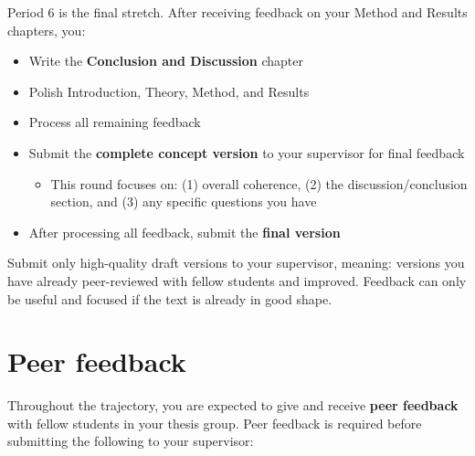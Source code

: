 \documentclass[
  11pt,
  a4paper,
]{scrbook}
\providecommand{\tightlist}{%
  \setlength{\itemsep}{0pt}\setlength{\parskip}{0pt}}\usepackage{longtable,booktabs,array}
\begin{document}
Period 6 is the final stretch. After receiving feedback on your Method
and Results chapters, you:

\begin{itemize}
\tightlist
\item
  Write the \textbf{Conclusion and Discussion} chapter
\item
  Polish Introduction, Theory, Method, and Results
\item
  Process all remaining feedback
\item
  Submit the \textbf{complete concept version} to your supervisor for
  final feedback

  \begin{itemize}
  \tightlist
  \item
    This round focuses on: (1) overall coherence, (2) the
    discussion/conclusion section, and (3) any specific questions you
    have
  \end{itemize}
\item
  After processing all feedback, submit the \textbf{final version}
\end{itemize}

\begin{tcolorbox}[enhanced jigsaw, bottomrule=.15mm, opacityback=0, toprule=.15mm, colframe=quarto-callout-note-color-frame, left=2mm, rightrule=.15mm, title=\textcolor{quarto-callout-note-color}{\faInfo}\hspace{0.5em}{Quality matters --- for you and your supervisor}, colbacktitle=quarto-callout-note-color!10!white, bottomtitle=1mm, colback=white, breakable, toptitle=1mm, titlerule=0mm, leftrule=.75mm, arc=.35mm, opacitybacktitle=0.6, coltitle=black]

Submit only high-quality draft versions to your supervisor, meaning:
versions you have already peer-reviewed with fellow students and
improved. Feedback can only be useful and focused if the text is already
in good shape.

\end{tcolorbox}

\section{Peer feedback}\label{peer-feedback}

Throughout the trajectory, you are expected to give and receive
\textbf{peer feedback} with fellow students in your thesis group. Peer
feedback is required before submitting the following to your supervisor:
\end{document}
